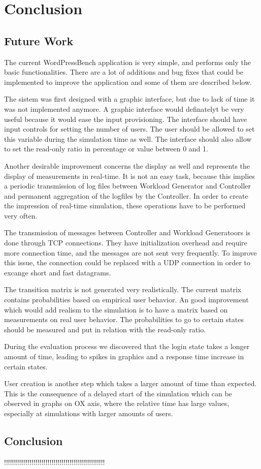 \chapter{Conclusion}
\label{chapter:chapter6}

\section{Future Work}
\label{sec:future-work}

The current WordPressBench application is very simple, and performs only the basic functionalities. There are a lot of additions and bug fixes that could be implemented to improve the application and some of them are described below.

The sistem was first designed with a graphic interface, but due to lack of time it was not implemented anymore. A graphic interface would definatelyt be very useful because it would ease the input provisioning. The interface should have input controls for setting the number of users. The user should be allowed to set this variable during the simulation time as well. The interface should also allow to set the read-only ratio in percentage or value between 0 and 1.

Another desirable improvement concerns the display as well and represents the display of measurements in real-time. It is not an easy task, because this implies a periodic transmission of log files between Workload Generator and Controller and permanent aggregation of the logfiles by the Controller. In order to create the impression of real-time simulation, these operations have to be performed very often.

The transmission of messages between Controller and Workload Generatoors is done through TCP connections. They have initialization overhead and require more connection time, and the messages are not sent very frequently. To improve this issue, the connection could be replaced with a UDP connection in order to excange short and fast datagrams.

The transition matrix is not generated very realistically. The current matrix contains probabilities based on empirical user behavior. An good improvement which would add realism to the simulation is to have a matrix based on measurements on real user behavior. The probabilities to go to certain states should be measured and put in relation with the read-only ratio.

During the evaluation process we discovered that the login state takes a longer amount of time, leading to spikes in graphics and a response time increase in certain states.

User creation is another step which takes a larger amount of time than expected. This is the consequence of a delayed start of the simulation which can be observed in graphs on OX axis, where the relative time has large values, especially at simulations with larger amounts of users.

\section{Conclusion}
\label{sec:system-architecture}

!!!!!!!!!!!!!!!!!!!!!!!!!!!!!!!!!!!!!!!!!!!!!!!!!!!
